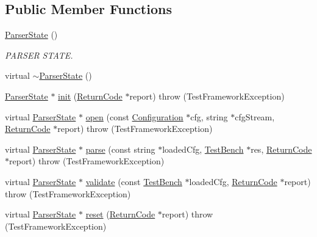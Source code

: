 \subsection*{Public Member Functions}
\begin{DoxyCompactItemize}
\item 
\hyperlink{classit_1_1testbench_1_1parser_1_1ParserState_aaf1f007449551a70735499fe303ae45e}{Parser\-State} ()
\begin{DoxyCompactList}\small\item\em P\-A\-R\-S\-E\-R S\-T\-A\-T\-E. \end{DoxyCompactList}\item 
virtual \hyperlink{classit_1_1testbench_1_1parser_1_1ParserState_a47a1a7b4922b3ed1b6af237a6f9d61b6}{$\sim$\-Parser\-State} ()
\item 
\hyperlink{classit_1_1testbench_1_1parser_1_1ParserState}{Parser\-State} $\ast$ \hyperlink{classit_1_1testbench_1_1parser_1_1ParserState_ae0cb9f5737ac335bac14466b7fddd641}{init} (\hyperlink{structit_1_1testbench_1_1data_1_1ReturnCode}{Return\-Code} $\ast$report)  throw (\-Test\-Framework\-Exception)
\item 
virtual \hyperlink{classit_1_1testbench_1_1parser_1_1ParserState}{Parser\-State} $\ast$ \hyperlink{classit_1_1testbench_1_1parser_1_1ParserState_a3ec7b3cd79f7725c702fd2b081e756de}{open} (const \hyperlink{structit_1_1testbench_1_1data_1_1Configuration}{Configuration} $\ast$cfg, string $\ast$cfg\-Stream, \hyperlink{structit_1_1testbench_1_1data_1_1ReturnCode}{Return\-Code} $\ast$report)  throw (\-Test\-Framework\-Exception)
\item 
virtual \hyperlink{classit_1_1testbench_1_1parser_1_1ParserState}{Parser\-State} $\ast$ \hyperlink{classit_1_1testbench_1_1parser_1_1ParserState_a0ab282825d0fcfa537cdee099f59228e}{parse} (const string $\ast$loaded\-Cfg, \hyperlink{structit_1_1testbench_1_1data_1_1TestBench}{Test\-Bench} $\ast$res, \hyperlink{structit_1_1testbench_1_1data_1_1ReturnCode}{Return\-Code} $\ast$report)  throw (\-Test\-Framework\-Exception)
\item 
virtual \hyperlink{classit_1_1testbench_1_1parser_1_1ParserState}{Parser\-State} $\ast$ \hyperlink{classit_1_1testbench_1_1parser_1_1ParserState_ae7f149551a8a7abce9dc3d6ffcdf684c}{validate} (const \hyperlink{structit_1_1testbench_1_1data_1_1TestBench}{Test\-Bench} $\ast$loaded\-Cfg, \hyperlink{structit_1_1testbench_1_1data_1_1ReturnCode}{Return\-Code} $\ast$report)  throw (\-Test\-Framework\-Exception)
\item 
virtual \hyperlink{classit_1_1testbench_1_1parser_1_1ParserState}{Parser\-State} $\ast$ \hyperlink{classit_1_1testbench_1_1parser_1_1ParserState_ac484747e6178b71b937eec45265fb4a7}{reset} (\hyperlink{structit_1_1testbench_1_1data_1_1ReturnCode}{Return\-Code} $\ast$report)  throw (\-Test\-Framework\-Exception)

\end{DoxyCompactItemize}

